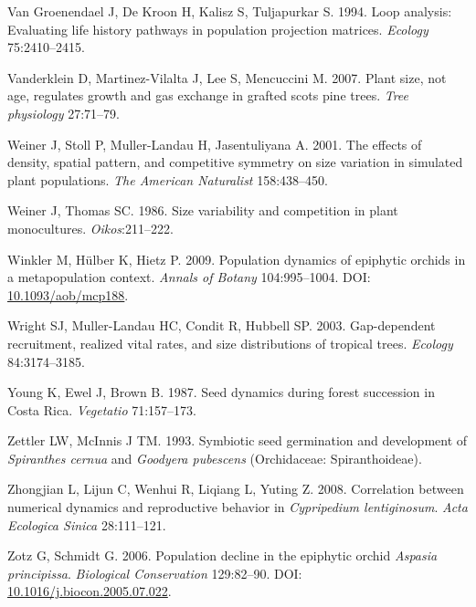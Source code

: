 \documentclass[
  12pt,
  letterpaper,
]{book}
\newlength{\cslhangindent}
\newenvironment{CSLReferences}[2] %
 {\begin{list}{}{%
  \setlength{\itemindent}{0pt}
  \setlength{\leftmargin}{0pt}
  \setlength{\parsep}{0pt}
  \ifodd #1
   \setlength{\leftmargin}{\cslhangindent}
   \setlength{\itemindent}{-1\cslhangindent}
  \fi
  \setlength{\itemsep}{#2\baselineskip}}}
 {\end{list}}
\begin{document}
\begin{CSLReferences}{1}{0}
Van Groenendael J, De Kroon H, Kalisz S, Tuljapurkar S. 1994. Loop
analysis: Evaluating life history pathways in population projection
matrices. \emph{Ecology} 75:2410--2415.

Vanderklein D, Martinez-Vilalta J, Lee S, Mencuccini M. 2007. Plant
size, not age, regulates growth and gas exchange in grafted scots pine
trees. \emph{Tree physiology} 27:71--79.

Weiner J, Stoll P, Muller-Landau H, Jasentuliyana A. 2001. The effects
of density, spatial pattern, and competitive symmetry on size variation
in simulated plant populations. \emph{The American Naturalist}
158:438--450.

Weiner J, Thomas SC. 1986. Size variability and competition in plant
monocultures. \emph{Oikos}:211--222.

Winkler M, Hülber K, Hietz P. 2009. Population dynamics of epiphytic
orchids in a metapopulation context. \emph{Annals of Botany}
104:995--1004. DOI:
\href{https://doi.org/10.1093/aob/mcp188}{10.1093/aob/mcp188}.

Wright SJ, Muller-Landau HC, Condit R, Hubbell SP. 2003. Gap-dependent
recruitment, realized vital rates, and size distributions of tropical
trees. \emph{Ecology} 84:3174--3185.

Young K, Ewel J, Brown B. 1987. Seed dynamics during forest succession
in {C}osta {R}ica. \emph{Vegetatio} 71:157--173.

Zettler LW, McInnis J TM. 1993. Symbiotic seed germination and
development of \emph{{S}piranthes cernua} and \emph{{G}oodyera
pubescens} ({O}rchidaceae: {S}piranthoideae).

Zhongjian L, Lijun C, Wenhui R, Liqiang L, Yuting Z. 2008. Correlation
between numerical dynamics and reproductive behavior in
\emph{{C}ypripedium {l}entiginosum}. \emph{Acta Ecologica Sinica}
28:111--121.

Zotz G, Schmidt G. 2006. Population decline in the epiphytic orchid
\emph{{A}spasia {p}rincipissa}. \emph{Biological Conservation}
129:82--90. DOI:
\href{https://doi.org/10.1016/j.biocon.2005.07.022}{10.1016/j.biocon.2005.07.022}.

\end{CSLReferences}


\backmatter
\end{document}
